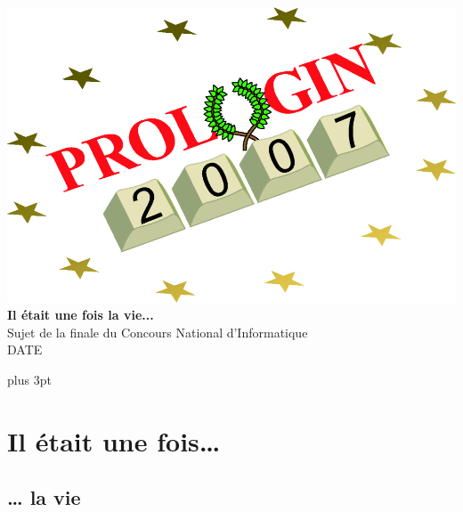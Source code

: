 \documentclass[a4paper,twoside,12pt]{article}
\begin{document}
\pagestyle{empty}
\sloppy

\lhead[\thepage]{\nouppercase \leftmark}
\cfoot{}

\begin{titlepage}
\begin{center}
\includegraphics[width=\linewidth]{logo}\\
\vspace{4cm}
\Huge
\textbf{Il \'etait une fois la vie...}\\
\vspace{2cm}
\normalsize
Sujet de la finale du Concours National d'Informatique\\
DATE\\
\end{center}
\end{titlepage}

\cleardoublepage
\tableofcontents

\cleardoublepage
\setcounter{page}{1}
\pagestyle{fancy}
\parskip=6pt plus 3pt

\section{Il \'etait une fois\ldots} %

 \subsection{\ldots{} la vie}
\end{document}
